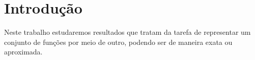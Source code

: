 \section{Introdução}

Neste trabalho estudaremos resultados que tratam da tarefa de representar um conjunto de funções por meio de outro, podendo ser de maneira exata ou aproximada.